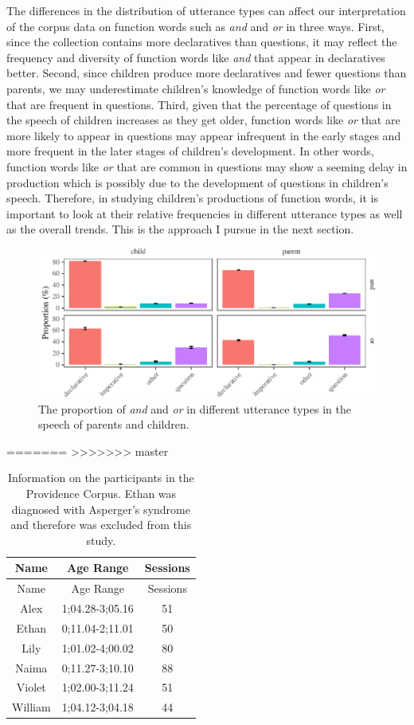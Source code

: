 \documentclass[,man,floatsintext]{apa6}
\begin{document}
The differences in the distribution of utterance types can affect our interpretation of the corpus data on function words such as \emph{and} and \emph{or} in three ways. First, since the collection contains more declaratives than questions, it may reflect the frequency and diversity of function words like \emph{and} that appear in declaratives better. Second, since children produce more declaratives and fewer questions than parents, we may underestimate children's knowledge of function words like \emph{or} that are frequent in questions. Third, given that the percentage of questions in the speech of children increases as they get older, function words like \emph{or} that are more likely to appear in questions may appear infrequent in the early stages and more frequent in the later stages of children's development. In other words, function words like \emph{or} that are common in questions may show a seeming delay in production which is possibly due to the development of questions in children's speech. Therefore, in studying children's productions of function words, it is important to look at their relative frequencies in different utterance types as well as the overall trends. This is the approach I pursue in the next section.

\begin{figure}[tb]

{\centering \includegraphics{figs/CnctPropbySpeechAct-1} 

}

\caption{The proportion of \textit{and} and \textit{or} in different utterance types in the speech of parents and children.}\label{fig:CnctPropbySpeechAct}
\end{figure}

=======
>>>>>>> master
\begin{longtable}[]{@{}ccc@{}}
\caption{\label{tab:providence} Information on the participants in the Providence Corpus. Ethan was diagnosed with Asperger's syndrome and therefore was excluded from this study.}\tabularnewline
\toprule
Name & Age Range & Sessions\tabularnewline
\midrule
\endfirsthead
\toprule
Name & Age Range & Sessions\tabularnewline
\midrule
\endhead
Alex & 1;04.28-3;05.16 & 51\tabularnewline
Ethan & 0;11.04-2;11.01 & 50\tabularnewline
Lily & 1;01.02-4;00.02 & 80\tabularnewline
Naima & 0;11.27-3;10.10 & 88\tabularnewline
Violet & 1;02.00-3;11.24 & 51\tabularnewline
William & 1;04.12-3;04.18 & 44\tabularnewline
\bottomrule
\end{longtable}
\end{document}
